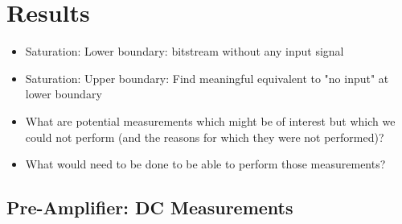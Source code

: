 \chapter{Results}
\label{chap:results}


\begin{itemize}\tightlist
    \item
        Saturation: Lower boundary: bitstream without any input signal
    \item
        Saturation: Upper boundary: Find meaningful equivalent to "no input" at lower boundary
    \item
        What are potential  measurements which might be of  interest but which
        we  could  not perform  (and  the  reasons  for  which they  were  not
        performed)?
    \item
        What would need to be done to be able to perform those measurements?
\end{itemize}


\section{Pre-Amplifier: DC Measurements}
\label{sec:preAmpDC}

